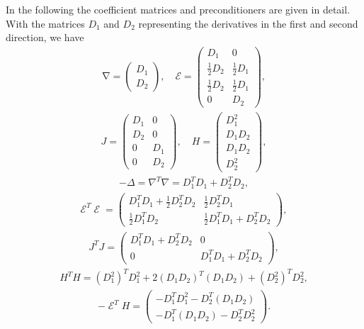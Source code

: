 \documentclass[twocolumn,envcountsame]{svjour3}
\DeclareMathOperator{\grad}{\nabla}
\DeclareMathOperator{\symgrad}{\mathcal{E}}
\begin{document}
 In the following the coefficient matrices and preconditioners are given in
 detail.
With the matrices $D_1$ and $D_2$ representing the derivatives in the first and second
direction,
we have
\begin{align*}
  \grad =\begin{pmatrix}D_1\\D_2\end{pmatrix},\quad
  \mathcal{E}=\begin{pmatrix}D_1 & 0\\ \frac{1}{2}D_2 & \frac{1}{2}D_1 \\ 
	\frac{1}{2}D_2 & \frac{1}{2}D_1 \\ 
	0 & D_2\end{pmatrix},
\end{align*}
\begin{align*}
  J = \begin{pmatrix}D_1 & 0\\ D_2 & 0 \\ 
	0 & D_1 \\ 
	0 & D_2\end{pmatrix},\quad
  H = \begin{pmatrix}D_1^2 \\ D_1D_2 \\ 
	D_1D_2  \\ 
	D_2^2\end{pmatrix},
\end{align*}
\begin{align*}
  -\Delta = \nabla^T\nabla = D_1^TD_1 + D_2^TD_2,
\end{align*}
\begin{align*}
  \mathcal{E}^T\symgrad=\begin{pmatrix} D_1^TD_1+\frac{1}{2}D_2^TD_2 & \frac{1}{2}D_2^TD_1\\
    \frac{1}{2}D_1^TD_2 & \frac{1}{2}D_1^TD_1+D_2^TD_2\end{pmatrix},
\end{align*}
\begin{align*}
  J^TJ=\begin{pmatrix} D_1^TD_1+D_2^TD_2 & 0\\
    0 & D_1^TD_1+D_2^TD_2\end{pmatrix},
\end{align*}
\begin{align*}
	H^TH=(D_1^2)^TD_1^2+2(D_1D_2)^T(D_1D_2)+(D_2^2)^TD_2^2,
\end{align*}
\begin{align*}
  -\symgrad^TH=\begin{pmatrix}-D_1^TD_1^2-D_2^T(D_1D_2)\\-D_1^T(D_1D_2)-D_2^TD_2^2\end{pmatrix}.
\end{align*}
\end{document}
